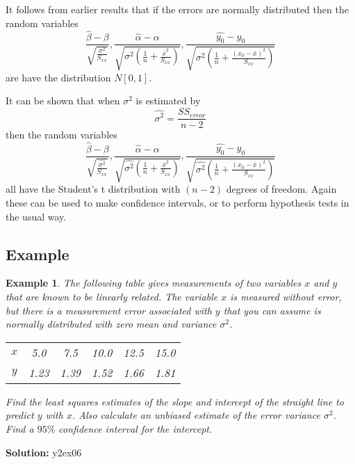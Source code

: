 \documentclass[12pt]{article}
\newtheorem{example}[theorem]{Example}
\begin{document}
It follows from earlier results that if the errors are normally distributed then the random variables
$$\frac{\hat{\beta}-\beta}{\sqrt{\frac{\sigma^{2}}{S_{xx}}}}, \frac{\hat{\alpha}-\alpha}{\sqrt{\sigma^{2}\left(\frac{1}{n}+\frac{\bar{x}^{2}}{S_{xx}}\right)}}, \frac{\hat{y_{0}}-y_{0}}{\sqrt{\sigma^{2}\left(\frac{1}{n}+\frac{(x_{0}-\bar{x})^{2}}{S_{xx}}\right)}}$$
are have the distribution $N[0,1].$

It can be shown that when $\sigma^{2}$ is estimated by $$\hat{\sigma^{2}}=\frac{SS_{error}}{n-2}$$ then the random variables
$$\frac{\hat{\beta}-\beta}{\sqrt{\frac{\hat{\sigma^{2}}}{S_{xx}}}}, \frac{\hat{\alpha}-\alpha}{\sqrt{\hat{\sigma^{2}}\left(\frac{1}{n}+\frac{\bar{x}^{2}}{S_{xx}}\right)}}, \frac{\hat{y_{0}}-y_{0}}{\sqrt{\hat{\sigma^{2}}\left(\frac{1}{n}+\frac{(x_{0}-\bar{x})^{2}}{S_{xx}}\right)}}$$
all have the Student's t distribution with $(n-2)$ degrees of freedom. Again these can be used to make confidence intervals, or to perform hypothesis tests in the usual way.

\subsection{Example}
\begin{example}
The following table gives measurements of two variables $x$ and $y$ that are known to be linearly related. The variable $x$ is measured without error, but there is a measurement error associated with $y$ that you can assume is normally distributed with zero mean and variance $\sigma^{2}$.
\begin{center}
\begin{tabular}{|c|c|c|c|c|c|}
  \hline
$x$&	 5.0&	 7.5&	10.0&	12.5&	15.0\\
$y$& 	1.23&	1.39&	1.52&	1.66&	1.81 \\
  \hline
\end{tabular}
\end{center}
Find the least squares estimates of the slope and intercept of the straight line to predict $y$ with $x$. Also calculate an unbiased estimate of the error variance $\sigma^{2}$. Find a $95\%$ confidence interval for the intercept.									
\end{example}

\begin{mdframed}
{\bf Solution:}
\textcolor[rgb]{1.00,1.00,1.00}{y2ex06\lipsum[1-7]}
\end{mdframed}
\end{document}
